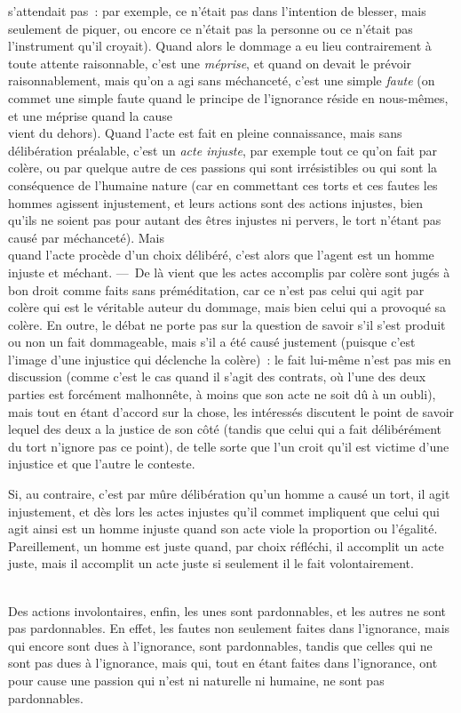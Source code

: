 \documentclass[french,twoside]{book} %
\begin{document}
s’attendait pas : par exemple, ce n’était pas dans l’intention de blesser, mais seulement de piquer, ou encore ce n’était pas la personne ou ce n’était pas l’instrument qu’il croyait). Quand alors le dommage a eu lieu contrairement à toute attente raisonnable, c’est une {\itshape méprise}, et quand on devait le prévoir raisonnablement, mais qu’on a agi sans méchanceté, c’est une simple {\itshape faute} (on commet une simple faute quand le principe de l’ignorance réside en nous-mêmes, et une méprise quand la cause \\
vient du dehors). Quand l’acte est fait en pleine connaissance, mais sans délibération préalable, c’est un {\itshape acte injuste}, par exemple tout ce qu’on fait par colère, ou par quelque autre de ces passions qui sont irrésistibles ou qui sont la conséquence de l’humaine nature (car en commettant ces torts et ces fautes les hommes agissent injustement, et leurs actions sont des actions injustes, bien qu’ils ne soient pas pour autant des êtres injustes ni pervers, le tort n’étant pas causé par méchanceté). Mais \\
quand l’acte procède d’un choix délibéré, c’est alors que l’agent est un homme injuste et méchant. — De là vient que les actes accomplis par colère sont jugés à bon droit comme faits sans préméditation, car ce n’est pas celui qui agit par colère qui est le véritable auteur du dommage, mais bien celui qui a provoqué sa colère. En outre, le débat ne porte pas sur la question de savoir s’il s’est produit ou non un fait dommageable, mais s’il a été causé justement (puisque c’est l’image d’une injustice qui déclenche la colère) : le fait lui-même n’est pas mis en \\
discussion (comme c’est le cas quand il s’agit des contrats, où l’une des deux parties est forcément malhonnête, à moins que son acte ne soit dû à un oubli), mais tout en étant d’accord sur la chose, les intéressés discutent le point de savoir lequel des deux a la justice de son côté (tandis que celui qui a fait délibérément du tort n’ignore pas ce point), de telle sorte que l’un croit qu’il est victime d’une injustice et que l’autre le conteste.\par
 Si, au contraire, c’est par mûre délibération qu’un homme a causé un tort, il agit injustement, et dès lors les actes injustes qu’il commet impliquent que celui qui agit ainsi est un homme injuste quand son acte viole la proportion ou l’égalité. Pareillement, un homme est juste quand, par choix réfléchi, il accomplit un acte juste, mais il accomplit un acte juste si seulement il le fait volontairement.\par
\\
Des actions involontaires, enfin, les unes sont pardonnables, et les autres ne sont pas pardonnables. En effet, les fautes non seulement faites dans l’ignorance, mais qui encore sont dues à l’ignorance, sont pardonnables, tandis que celles qui ne sont pas dues à l’ignorance, mais qui, tout en étant faites dans l’ignorance, ont pour cause une passion qui n’est ni naturelle ni humaine, ne sont pas pardonnables.
\end{document}
